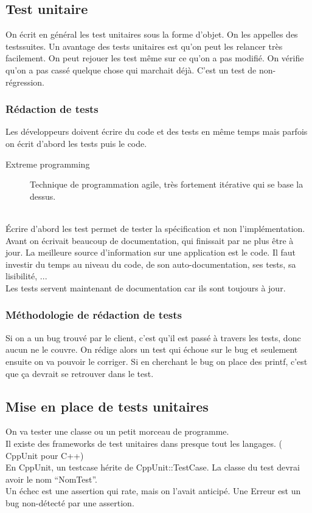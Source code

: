 \subsection{Test unitaire}
	On écrit en général les test unitaires sous la forme d’objet. On les appelles des testssuites. Un avantage des tests unitaires est qu’on peut les relancer très facilement. On peut rejouer les test même sur ce qu’on a pas modifié. On vérifie qu’on a pas cassé quelque chose qui marchait déjà. C’est un test de non-régression.


\subsubsection{Rédaction de tests}
	Les développeurs doivent écrire du code et des tests en même temps mais parfois on écrit d’abord les tests puis le code.
	\begin{description}
		\item[Extreme programming] Technique de programmation agile, très fortement itérative qui se base la dessus.
	\end{description}
	\\Écrire d’abord les test permet de tester la spécification et non l’implémentation.
	\\Avant on écrivait beaucoup de documentation, qui finissait par ne plus être à jour. La meilleure source d’information sur une application est le code. Il faut investir du temps au niveau du code, de son auto-documentation, ses tests, sa lisibilité, ...
	\\Les tests servent maintenant de documentation car ils sont toujours à jour.


\subsubsection{Méthodologie de rédaction de tests}
	Si on a un bug trouvé par le client, c’est qu’il est passé à travers les tests, donc aucun ne le couvre.
	On rédige alors un test qui échoue sur le bug et seulement ensuite on va pouvoir le corriger.
	Si en cherchant le bug on place des printf, c’est que ça devrait se retrouver dans le test.


\subsection{Mise en place de tests unitaires}
	On va tester une classe ou un petit morceau de programme.
	\\Il existe des frameworks de test unitaires dans presque tout les langages. ( CppUnit pour C++)
	\\En CppUnit, un testcase hérite de CppUnit::TestCase. La classe du test devrai avoir le nom “NomTest”.
	\\Un échec est une assertion qui rate, mais on l’avait anticipé. Une Erreur est un bug non-détecté par une assertion.


